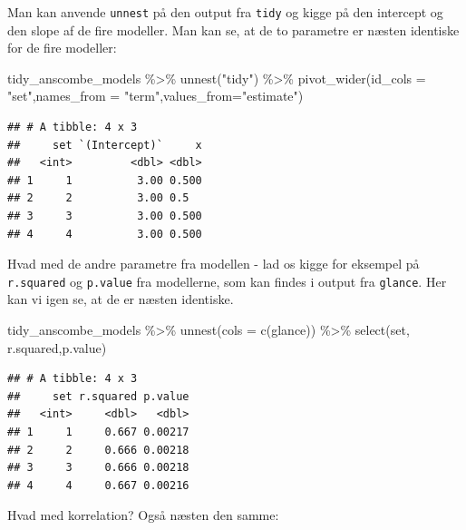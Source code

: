 \documentclass[
]{book}
\newenvironment{Shaded}{\begin{snugshade}}{\end{snugshade}}
\newcommand{\AttributeTok}[1]{\textcolor[rgb]{0.77,0.63,0.00}{#1}}
\newcommand{\FunctionTok}[1]{\textcolor[rgb]{0.00,0.00,0.00}{#1}}
\newcommand{\NormalTok}[1]{#1}
\newcommand{\SpecialCharTok}[1]{\textcolor[rgb]{0.00,0.00,0.00}{#1}}
\newcommand{\StringTok}[1]{\textcolor[rgb]{0.31,0.60,0.02}{#1}}
\begin{document}
Man kan anvende \texttt{unnest} på den output fra \texttt{tidy} og kigge på den intercept og den slope af de fire modeller. Man kan se, at de to parametre er næsten identiske for de fire modeller:

\begin{Shaded}
\begin{Highlighting}[]
\NormalTok{tidy\_anscombe\_models }\SpecialCharTok{\%\textgreater{}\%} \FunctionTok{unnest}\NormalTok{(}\StringTok{"tidy"}\NormalTok{) }\SpecialCharTok{\%\textgreater{}\%} 
  \FunctionTok{pivot\_wider}\NormalTok{(}\AttributeTok{id\_cols =} \StringTok{"set"}\NormalTok{,}\AttributeTok{names\_from =} \StringTok{"term"}\NormalTok{,}\AttributeTok{values\_from=}\StringTok{"estimate"}\NormalTok{) }
\end{Highlighting}
\end{Shaded}

\begin{verbatim}
## # A tibble: 4 x 3
##     set `(Intercept)`     x
##   <int>         <dbl> <dbl>
## 1     1          3.00 0.500
## 2     2          3.00 0.5  
## 3     3          3.00 0.500
## 4     4          3.00 0.500
\end{verbatim}

Hvad med de andre parametre fra modellen - lad os kigge for eksempel på \texttt{r.squared} og \texttt{p.value} fra modellerne, som kan findes i output fra \texttt{glance}. Her kan vi igen se, at de er næsten identiske.

\begin{Shaded}
\begin{Highlighting}[]
\NormalTok{tidy\_anscombe\_models }\SpecialCharTok{\%\textgreater{}\%} 
  \FunctionTok{unnest}\NormalTok{(}\AttributeTok{cols =} \FunctionTok{c}\NormalTok{(glance)) }\SpecialCharTok{\%\textgreater{}\%} 
  \FunctionTok{select}\NormalTok{(set, r.squared,p.value)}
\end{Highlighting}
\end{Shaded}

\begin{verbatim}
## # A tibble: 4 x 3
##     set r.squared p.value
##   <int>     <dbl>   <dbl>
## 1     1     0.667 0.00217
## 2     2     0.666 0.00218
## 3     3     0.666 0.00218
## 4     4     0.667 0.00216
\end{verbatim}

Hvad med korrelation? Også næsten den samme:
\end{document}
